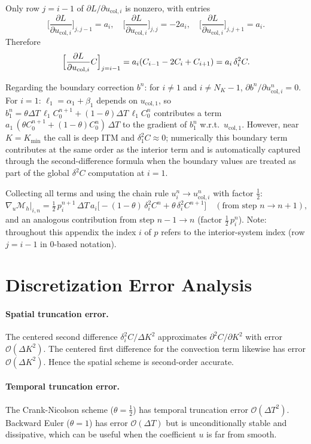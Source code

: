 \documentclass[11pt, a4paper]{article}
\newcommand{\dK}{\Delta K}
\newcommand{\dT}{\Delta T}
\newcommand{\pder}[2]{\frac{\partial #1}{\partial #2}}
\theoremstyle{definition}
\theoremstyle{plain}
\begin{document}
Only row $j = i-1$ of $\partial L/\partial u_{\text{col},i}$ is nonzero,
with entries
\[
  \bigl[\pder{L}{u_{\text{col},i}}\bigr]_{j,j-1} = a_i,
  \quad
  \bigl[\pder{L}{u_{\text{col},i}}\bigr]_{j,j}   = -2a_i,
  \quad
  \bigl[\pder{L}{u_{\text{col},i}}\bigr]_{j,j+1} = a_i.
\]
Therefore
\[
  \Bigl[\pder{L}{u_{\text{col},i}} C\Bigr]_{j=i-1}
  = a_i (C_{i-1} - 2C_i + C_{i+1}) = a_i\,\delta^2_i C.
\]

Regarding the boundary correction $b^n$: for $i \neq 1$ and $i \neq N_K-1$,
$\partial b^n / \partial u_{\text{col},i}^n = 0$. For $i=1$:
$\ell_1 = \alpha_1 + \beta_1$ depends on $u_{\text{col},1}$, so
$b^n_1 = \theta\dT\,\ell_1 C_0^{n+1} + (1-\theta)\dT\,\ell_1 C_0^n$
contributes a term $a_1\,(\theta C_0^{n+1} + (1-\theta) C_0^n)\,\dT$
to the gradient of $b^n_1$ w.r.t.\ $u_{\text{col},1}$. However, near
$K = K_{\min}$ the call is deep ITM and $\delta^2_1 C \approx 0$;
numerically this boundary term contributes at the same order as the
interior term and is automatically captured through the second-difference
formula when the boundary values are treated as part of the global
$\delta^2 C$ computation at $i=1$.

Collecting all terms and using the chain rule
$u_i^n \to u_{\text{col},i}^n$ with factor $\tfrac{1}{2}$:
\[
  \nabla_u \mathcal{M}_h \big|_{i,n}
  = \tfrac{1}{2}\,p_{i}^{n+1}\,\dT\,a_i
    \bigl[-(1-\theta)\,\delta^2_i C^n + \theta\,\delta^2_i C^{n+1}\bigr]
  \quad (\text{from step } n \to n+1),
\]
and an analogous contribution from step $n-1 \to n$ (factor
$\tfrac{1}{2}\,p_i^n$). Note: throughout this appendix the index $i$ of $p$
refers to the interior-system index (row $j = i-1$ in 0-based notation).

\section{Discretization Error Analysis}
\label{app:error}

\paragraph{Spatial truncation error.}
The centered second difference $\delta^2_i C / \dK^2$ approximates
$\partial^2 C / \partial K^2$ with error $\mathcal{O}(\dK^2)$. The
centered first difference for the convection term likewise has error
$\mathcal{O}(\dK^2)$. Hence the spatial scheme is second-order accurate.

\paragraph{Temporal truncation error.}
The Crank-Nicolson scheme ($\theta = \tfrac{1}{2}$) has temporal truncation
error $\mathcal{O}(\dT^2)$. Backward Euler ($\theta = 1$) has error
$\mathcal{O}(\dT)$ but is unconditionally stable and dissipative, which can
be useful when the coefficient $u$ is far from smooth.
\end{document}
